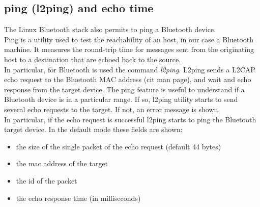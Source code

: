 \subsection{ping (l2ping) and echo time}
The Linux Bluetooth stack also permits to ping a Bluetooth device.\\
Ping is a utility used to test the reachability of an host, in our case a Bluetooth machine. It measures the round-trip time for messages sent from the originating host to a destination that are echoed back to the source.\\
In particular, for Bluetooth is used the command \textit{l2ping}. L2ping sends a L2CAP echo request to the Bluetooth MAC address (cit man page), and wait and echo response from the target device.
The ping feature is useful to understand if a Bluetooth device is in a particular range. If so, l2ping utility starts to send several echo requests to the target. If not, an error message is shown.\\

In particular, if the echo request is successful l2ping starts to ping the Bluetooth target device. In the default mode these fields are shown:\\
\begin{itemize}
\item the size of the single packet of the echo request (default 44 bytes)
\item the mac address of the target
\item the id of the packet
\item the echo response time (in milliseconds)
\end{itemize}

